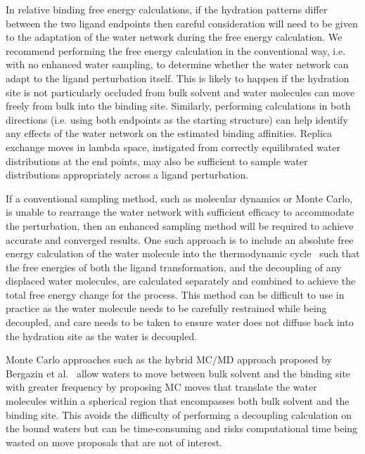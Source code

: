 \documentclass[9pt,bestpractices]{livecoms}
\begin{document}
In relative binding free energy calculations, if the hydration patterns differ between the two ligand endpoints then careful consideration will need to be given to the adaptation of the water network during the free energy calculation. We recommend performing the free energy calculation in the conventional way, i.e. with no enhanced water sampling, to determine whether the water network can adapt to the ligand perturbation itself. This is likely to happen if the hydration site is not particularly occluded from bulk solvent and water molecules can move freely from bulk into the binding site. Similarly, performing calculations in both directions (i.e. using both endpoints as the starting structure) can help identify any effects of the water network on the estimated binding affinities. Replica exchange moves in lambda space, instigated from correctly equilibrated water distributions at the end points, may also be sufficient to sample water distributions appropriately across a ligand perturbation.

If a conventional sampling method, such as molecular dynamics or Monte Carlo, is unable to rearrange the water network with sufficient efficacy to accommodate the perturbation, then an enhanced sampling method will be required to achieve accurate and converged results. One such approach is to include an absolute free energy calculation of the water molecule into the thermodynamic cycle~\cite{ross2020enhancing, hamelberg2004standard, barillari2007classification, yu2008free, ge2022abfewat} such that the free energies of both the ligand transformation, and the decoupling of any displaced water molecules, are calculated separately and combined to achieve the total free energy change for the process. This method can be difficult to use in practice as the water molecule needs to be carefully restrained while being decoupled, and care needs to be taken to ensure water does not diffuse back into the hydration site as the water is decoupled.

Monte Carlo approaches such as the hybrid MC/MD approach proposed by Bergazin et al.~\cite{bergazin2021enhancing, ben-shalom2021fast, ge2022enhancing} allow waters to move between bulk solvent and the binding site with greater frequency by proposing MC moves that translate the water molecules within a spherical region that encompasses both bulk solvent and the binding site. This avoids the difficulty of performing a decoupling calculation on the bound waters but can be time-consuming and risks computational time being wasted on move proposals that are not of interest.
\end{document}
